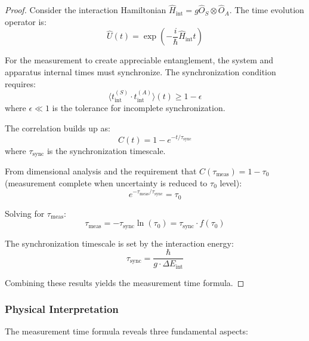 \begin{proof}
Consider the interaction Hamiltonian $\hat{H}_{\text{int}} = g \hat{O}_S \otimes \hat{O}_A$. The time evolution operator is:
\begin{equation}
    \hat{U}(t) = \exp\left(-\frac{i}{\hbar} \hat{H}_{\text{int}} t\right)
\end{equation}

For the measurement to create appreciable entanglement, the system and apparatus internal times must synchronize. The synchronization condition requires:
\begin{equation}
    \langle t_{\text{int}}^{(S)} \cdot t_{\text{int}}^{(A)} \rangle(t) \geq 1 - \epsilon
\end{equation}
where $\epsilon \ll 1$ is the tolerance for incomplete synchronization.

The correlation builds up as:
\begin{equation}
    C(t) = 1 - e^{-t/\tau_{\text{sync}}}
\end{equation}
where $\tau_{\text{sync}}$ is the synchronization timescale.

From dimensional analysis and the requirement that $C(\tau_{\text{meas}}) = 1 - \tau_0$ (measurement complete when uncertainty is reduced to $\tau_0$ level):
\begin{equation}
    e^{-\tau_{\text{meas}}/\tau_{\text{sync}}} = \tau_0
\end{equation}

Solving for $\tau_{\text{meas}}$:
\begin{equation}
    \tau_{\text{meas}} = -\tau_{\text{sync}} \ln(\tau_0) = \tau_{\text{sync}} \cdot f(\tau_0)
\end{equation}

The synchronization timescale is set by the interaction energy:
\begin{equation}
    \tau_{\text{sync}} = \frac{\hbar}{g \cdot \Delta E_{\text{int}}}
\end{equation}

Combining these results yields the measurement time formula.
\end{proof}

\subsubsection{Physical Interpretation}

The measurement time formula reveals three fundamental aspects:

